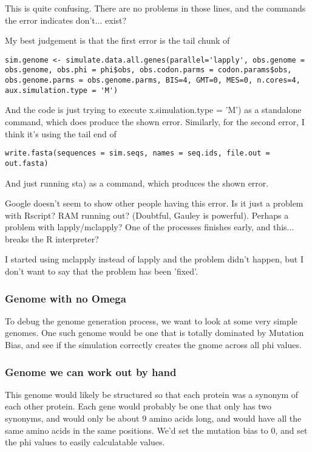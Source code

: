 This is quite confusing. There are no problems in those lines, and the commands the error indicates don't... exist?

My best judgement is that the first error is the tail chunk of
\begin{verbatim}
sim.genome <- simulate.data.all.genes(parallel='lapply', obs.genome = obs.genome, obs.phi = phi$obs, obs.codon.parms = codon.params$obs, obs.genome.parms = obs.genome.parms, BIS=4, GMT=0, MES=0, n.cores=4, aux.simulation.type = 'M')
\end{verbatim}

And the code is just trying to execute x.simulation.type = 'M') as a standalone command, which does produce the shown error. Similarly, for the second error, I think it's using the tail end of

\begin{verbatim}
write.fasta(sequences = sim.seqs, names = seq.ids, file.out = out.fasta)
\end{verbatim}

And just running sta) as a command, which produces the shown error.

Google doesn't seem to show other people having this error. Is it just a problem with Rscript? RAM running out? (Doubtful, Gauley is powerful). Perhaps a problem with lapply/mclapply? One of the processes finishes early, and this... breaks the R interpreter?

I started using mclapply instead of lapply and the problem didn't happen, but I don't want to say that the problem has been 'fixed'.


\subsubsection{Genome with no Omega}

To debug the genome generation process, we want to look at some very simple genomes. One such genome would be one that is totally dominated by Mutation Bias, and see if the simulation correctly creates the gnome across all phi values.

\subsubsection{Genome we can work out by hand}

This genome would likely be structured so that each protein was a synonym of each other protein. Each gene would probably be one that only has two synonyms, and would only be about 9 amino acids long, and would have all the same amino acids in the same positions. We'd set the mutation bias to 0, and set the phi values to easily calculatable values. 

